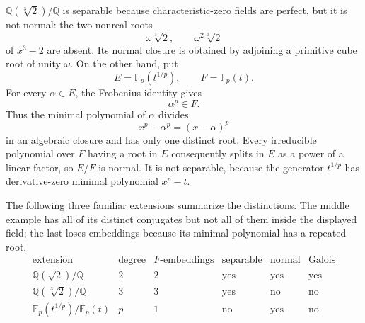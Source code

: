 \begin{example}
\(\mathbb Q(\sqrt[3]2)/\mathbb Q\) is separable because characteristic-zero
fields are perfect, but it is not normal: the two nonreal roots
\[
\omega\sqrt[3]2,\qquad\omega^2\sqrt[3]2
\]
of \(x^3-2\) are absent.  Its normal closure is obtained by adjoining a
primitive cube root of unity \(\omega\).  On the other hand, put
\[
E=\mathbb F_p(t^{1/p}),
\qquad
F=\mathbb F_p(t).
\]
For every \(\alpha\in E\), the Frobenius identity gives
\[
\alpha^p\in F.
\]
Thus the minimal polynomial of \(\alpha\) divides
\[
x^p-\alpha^p=(x-\alpha)^p
\]
in an algebraic closure and has only one distinct root.  Every irreducible
polynomial over \(F\) having a root in \(E\) consequently splits in \(E\) as
a power of a linear factor, so \(E/F\) is normal.  It is not separable,
because the generator \(t^{1/p}\) has derivative-zero minimal polynomial
\(x^p-t\).
\end{example}

The following three familiar extensions summarize the distinctions.  The
middle example has all of its distinct conjugates but not all of them inside
the displayed field; the last loses embeddings because its minimal polynomial
has a repeated root.
\[
\begin{array}{c|c|c|c|c|c}
\text{extension} & \text{degree} & \text{\(F\)-embeddings}
& \text{separable} & \text{normal} & \text{Galois}\\ \hline
\mathbb Q(\sqrt2)/\mathbb Q & 2 & 2 & \text{yes} & \text{yes} & \text{yes}\\
\mathbb Q(\sqrt[3]2)/\mathbb Q & 3 & 3 & \text{yes} & \text{no} & \text{no}\\
\mathbb F_p(t^{1/p})/\mathbb F_p(t) & p & 1 & \text{no} & \text{yes} & \text{no}
\end{array}
\]

